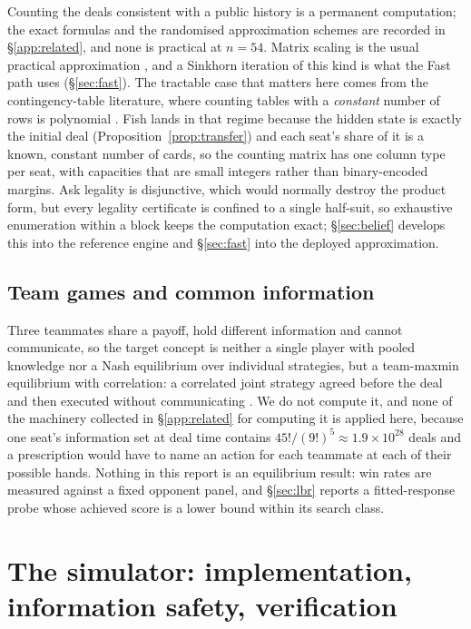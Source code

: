 \documentclass[11pt]{article}
\theoremstyle{definition}
\begin{document}
Counting the deals consistent with a public history is a permanent computation;
the exact formulas and the randomised approximation schemes are recorded in
\S\ref{app:related}, and none is practical at $n = 54$. Matrix scaling is the
usual practical approximation \cite{lsw}, and a Sinkhorn iteration of this kind
is what the Fast path uses (\S\ref{sec:fast}). The tractable case that matters
here comes from the contingency-table literature, where counting tables with a
\emph{constant} number of rows is polynomial \cite{cryan-dyer}. Fish lands in
that regime because the hidden state is exactly the initial deal
(Proposition~\ref{prop:transfer}) and each seat's share of it is a known,
constant number of cards, so the counting matrix has one column type per seat,
with capacities that are small integers rather than binary-encoded margins. Ask
legality is disjunctive, which would normally destroy the product form, but
every legality certificate is confined to a single half-suit, so
exhaustive enumeration within a block keeps the computation exact; \S\ref{sec:belief}
develops this into the reference engine and \S\ref{sec:fast} into the deployed
approximation.

\subsection{Team games and common information}

Three teammates share a payoff, hold different information and cannot
communicate, so the target concept is neither a single player with pooled
knowledge nor a Nash equilibrium over individual strategies, but a team-maxmin
equilibrium with correlation: a correlated joint strategy agreed before the deal
and then executed without communicating \cite{celli-gatti}. We do not compute it,
and none of the machinery collected in \S\ref{app:related} for computing it is
applied here, because one seat's information set at deal time contains
$45!/(9!)^5 \approx 1.9 \times 10^{28}$ deals and a prescription would have to
name an action for each teammate at each of their possible hands. Nothing in this
report is an equilibrium result: win rates are measured against a fixed opponent
panel, and \S\ref{sec:lbr} reports a fitted-response probe whose achieved score
is a lower bound within its search class.
\section{The simulator: implementation, information safety, verification}
\label{sec:engine}
\end{document}
